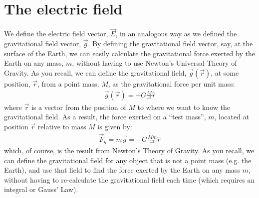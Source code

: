 \section{The electric field}
We define the electric field vector, $\vec E$, in an analogous way as we defined the gravitational field vector, $\vec g$. By defining the gravitational field vector, say, at the surface of the Earth, we can easily calculate the gravitational force exerted by the Earth on any mass, $m$, without having to use Newton's Universal Theory of Gravity. As you recall, we can define the gravitational field, $\vec g(\vec r)$, at some position, $\vec r$, from a point mass, $M$, as the gravitational force per unit mass:
\begin{align*}
\vec g(\vec r) = -G \frac{M}{r^2}\hat r
\end{align*}
where $\vec r$ is a vector from the position of $M$ to where we want to know the gravitational field. As a result, the force exerted on a ``test mass'', $m$, located at position $\vec r$ relative to mass $M$ is given by:
\begin{align*}
\vec F_g=m\vec g= -G\frac{Mm}{r^2}\hat r
\end{align*}
which, of course, is the result from Newton's Theory of Gravity. As you recall, we can define the gravitational field for  any object that is not a point mass (e.g. the Earth), and use that field to find the force exerted by the Earth on any mass $m$, without having to re-calculate the gravitational field each time (which requires an integral or Gauss' Law). 

